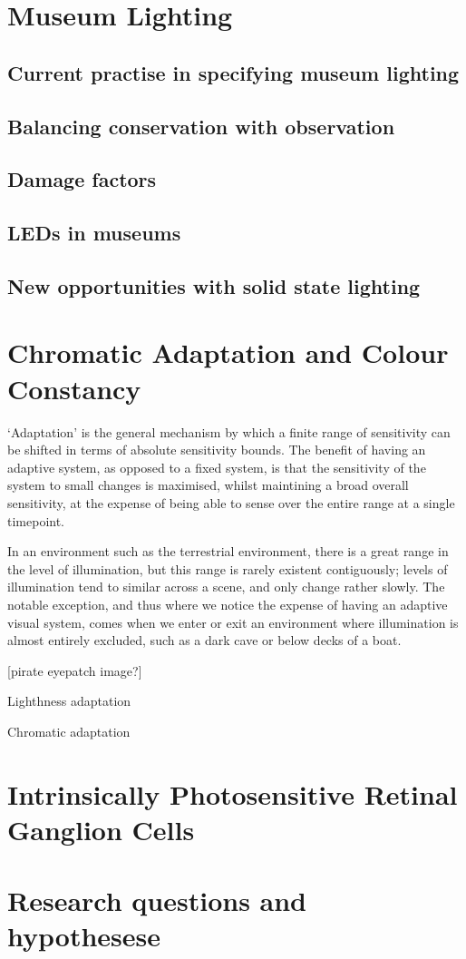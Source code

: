 \section{Museum Lighting}
\subsection{Current practise in specifying museum lighting}
\subsection{Balancing conservation with observation}
\subsection{Damage factors}
\subsection{LEDs in museums}
\subsection{New opportunities with solid state lighting}

\section{Chromatic Adaptation and Colour Constancy}
`Adaptation' is the general mechanism by which a finite range of sensitivity can be shifted in terms of absolute sensitivity bounds. The benefit of having an adaptive system, as opposed to a fixed system, is that the sensitivity of the system to small changes is maximised, whilst maintining a broad overall sensitivity, at the expense of being able to sense over the entire range at a single timepoint. 

In an environment such as the terrestrial environment, there is a great range in the level of illumination, but this range is rarely existent contiguously; levels of illumination tend to similar across a scene, and only change rather slowly. The notable exception, and thus where we notice the expense of having an adaptive visual system, comes when we enter or exit an environment where illumination is almost entirely excluded, such as a dark cave or below decks of a boat. 

[pirate eyepatch image?]

Lighthness adaptation

Chromatic adaptation



\section{Intrinsically Photosensitive Retinal Ganglion Cells}
\section{Research questions and hypothesese}
